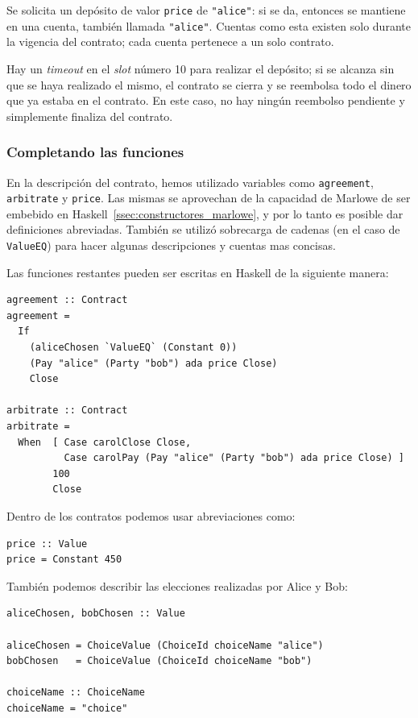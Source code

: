 \documentclass[12pt]{book}
\begin{document}
Se solicita un depósito de valor \texttt{price} de \texttt{"{}alice"{}}: si se da, entonces se mantiene en una cuenta, también llamada \texttt{"{}alice"{}}. Cuentas como esta existen solo durante la vigencia del contrato; cada cuenta pertenece a un solo contrato. %

Hay un \textit{timeout} en el \textit{slot} número 10 para realizar el depósito; si se alcanza sin que se haya realizado el mismo, el contrato se cierra y se reembolsa todo el dinero que ya estaba en el contrato. En este caso, no hay ningún reembolso pendiente y simplemente finaliza del contrato.

\subsubsection{Completando las funciones}
En la descripción del contrato, hemos utilizado variables como \texttt{agreement}, \texttt{arbitrate} y \texttt{price}. Las mismas se aprovechan de la capacidad de Marlowe de ser embebido en Haskell~\ref{ssec:constructores_marlowe}, y por lo tanto es posible dar definiciones abreviadas. También se utilizó sobrecarga de cadenas (en el caso de \texttt{ValueEQ}) para hacer algunas descripciones y cuentas mas concisas.

Las funciones restantes pueden ser escritas en Haskell de la siguiente manera:

\begin{lstlisting}[style=Haskell-cardano, language=Marlowe, caption=Funciones \texttt{agreement} y \texttt{arbitrate}.]
agreement :: Contract
agreement =
  If
    (aliceChosen `ValueEQ` (Constant 0))
    (Pay "alice" (Party "bob") ada price Close)
    Close

arbitrate :: Contract
arbitrate =
  When  [ Case carolClose Close,
          Case carolPay (Pay "alice" (Party "bob") ada price Close) ]
        100
        Close
\end{lstlisting}

Dentro de los contratos podemos usar abreviaciones como:

\begin{lstlisting}[style=Haskell-cardano, language=Marlowe, caption=Funcion \texttt{price}.]
price :: Value
price = Constant 450
\end{lstlisting}


También podemos describir las elecciones realizadas por Alice y Bob:

\begin{lstlisting}[style=Haskell-cardano, language=Marlowe, caption=Definicion de las elecciones.]
aliceChosen, bobChosen :: Value

aliceChosen = ChoiceValue (ChoiceId choiceName "alice")
bobChosen   = ChoiceValue (ChoiceId choiceName "bob")

choiceName :: ChoiceName
choiceName = "choice"
\end{lstlisting}
\end{document}
